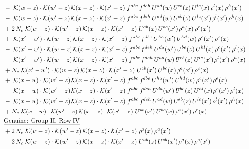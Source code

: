 \documentclass[10pt]{article}
\numberwithin{equation}{section}
\begin{document}
\begin{align}
&\quad -\;\mathcal{K}(w-z)\cdot\mathcal{K}(w'-z)\,\mathcal{K}(x-z)\cdot\mathcal{K}(x'-z)\;f^{abc}\,f^{deh}\,U^{ad}(w)\,U^{eb}(z)\,U^{lc}(x)\,\rho^{l}(x)\,\rho^{h}(x')\notag\\
&\quad -\;\mathcal{K}(w-z)\cdot\mathcal{K}(w'-z)\,\mathcal{K}(x-z)\cdot\mathcal{K}(x'-z)\;f^{abc}\,f^{deh}\,U^{ad}(w)\,U^{eb}(z)\,U^{lc}(x')\,\rho^{l}(x')\,\rho^{h}(x)\notag\\
&\quad +2\,N_c\;\mathcal{K}(w-z)\cdot\mathcal{K}(w'-z)\,\mathcal{K}(x-z)\cdot\mathcal{K}(x'-z)\;U^{ab}(x)\,U^{bc}(x')\,\rho^{a}(x)\,\rho^{c}(x')\notag\\
&\quad +\;\mathcal{K}(x'-w')\cdot\mathcal{K}(w-z)\,\mathcal{K}(x-z)\cdot\mathcal{K}(x'-z)\;f^{abc}\,f^{dbe}\,U^{ha}(w')\,U^{hd}(w)\,\rho^{c}(x')\,\rho^{e}(x)\notag\\
&\quad -\;\mathcal{K}(x'-w')\cdot\mathcal{K}(w-z)\,\mathcal{K}(x-z)\cdot\mathcal{K}(x'-z)\;f^{abc}\,f^{deh}\,U^{da}(w')\,U^{be}(z)\,U^{hl}(x)\,\rho^{c}(x')\,\rho^{l}(x)\notag\\
&\quad -\;\mathcal{K}(x'-w')\cdot\mathcal{K}(w-z)\,\mathcal{K}(x-z)\cdot\mathcal{K}(x'-z)\;f^{abc}\,f^{deh}\,U^{ad}(w)\,U^{eb}(z)\,U^{lc}(x')\,\rho^{l}(x')\,\rho^{h}(x)\notag\\
&\quad +N_c\;\mathcal{K}(x'-w')\cdot\mathcal{K}(w-z)\,\mathcal{K}(x-z)\cdot\mathcal{K}(x'-z)\;U^{ab}(x')\,U^{bc}(x)\,\rho^{a}(x')\,\rho^{c}(x)\notag\\
&\quad +\;\mathcal{K}(x-w)\cdot\mathcal{K}(w'-z)\,\mathcal{K}(x-z)\cdot\mathcal{K}(x'-z)\;f^{abc}\,f^{dbe}\,U^{ha}(w')\,U^{hd}(w)\,\rho^{c}(x')\,\rho^{e}(x)\notag\\
&\quad -\;\mathcal{K}(x-w)\cdot\mathcal{K}(w'-z)\,\mathcal{K}(x-z)\cdot\mathcal{K}(x'-z)\;f^{abc}\,f^{deh}\,U^{da}(w')\,U^{be}(z)\,U^{hl}(x)\,\rho^{c}(x')\,\rho^{l}(x)\notag\\
&\quad -\;\mathcal{K}(x-w)\cdot\mathcal{K}(w'-z)\,\mathcal{K}(x-z)\cdot\mathcal{K}(x'-z)\;f^{abc}\,f^{deh}\,U^{ad}(w)\,U^{eb}(z)\,U^{lc}(x')\,\rho^{l}(x')\,\rho^{h}(x)\notag\\
&\quad +N_c\;\mathcal{K}(x-w)\cdot\mathcal{K}(w'-z)\,\mathcal{K}(x-z)\cdot\mathcal{K}(x'-z)\;U^{ab}(x')\,U^{bc}(x)\,\rho^{a}(x')\,\rho^{c}(x)\notag\\
&\quad\underline{\text{Genuine: Group II, Row IV}}\notag\\
&\quad +2\,N_c\;\mathcal{K}(w-z)\cdot\mathcal{K}(w'-z)\,\mathcal{K}(x-z)\cdot\mathcal{K}(x'-z)\;\rho^{a}(x)\,\rho^{a}(x')\notag\\
&\quad -2\,N_c\;\mathcal{K}(w-z)\cdot\mathcal{K}(w'-z)\,\mathcal{K}(x-z)\cdot\mathcal{K}(x'-z)\;U^{ab}(z)\,U^{cb}(x')\,\rho^{a}(x)\,\rho^{c}(x')\notag\\

\end{align}
\end{document}
